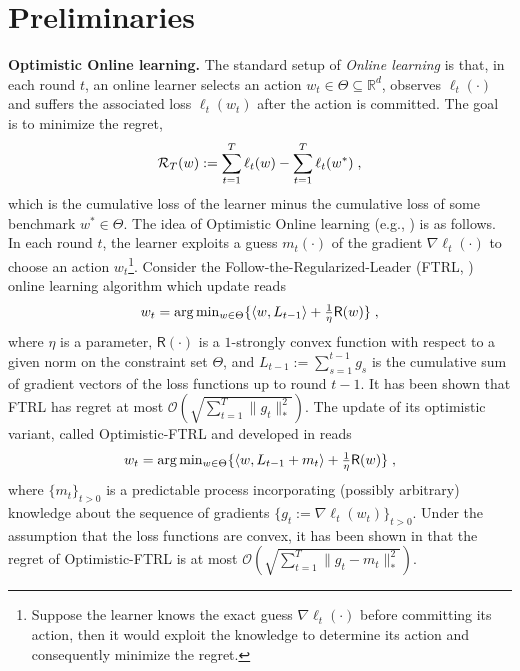 \documentclass[wcp]{jmlr}
\begin{document}
\section{Preliminaries}\label{sec:prelim}
\vspace{-0.05in}

\textbf{Optimistic Online learning.}\hspace{0.1cm}
The standard setup of \emph{Online learning} is that, in each round $t$, an online learner selects an action $w_{t} \in \Theta \subseteq \mathbb R^{d}$, observes $\ell_{t}(\cdot)$ and suffers the associated loss $\ell_{t}(w_t)$ after the action is committed.
The goal is to minimize the regret, 
$$\mathcal{R}_{T}( w  ):= \sum_{t=1}^T \ell_{t}(w) - \sum_{t=1}^T \ell_{t}(w^*)\eqsp,$$
which is the cumulative loss of the learner minus the cumulative loss of some benchmark $w^{*} \in \Theta$.
The idea of Optimistic Online learning (e.g., \citep{CJ12,RS13b,SALS15,ALLW18}) is as follows.
In each round $t$, the learner exploits a guess $m_t(\cdot)$ of the gradient $\nabla \ell_t(\cdot)$ to choose an action $w_t$\footnote{Suppose the learner knows the exact guess $\nabla \ell_t(\cdot)$ before committing its action, then it would exploit the knowledge to determine its action and consequently minimize the regret.}. 
Consider the Follow-the-Regularized-Leader (FTRL, \citep{H14}) online learning algorithm which update reads
\begin{equation} \notag
\textstyle w_t  = \arg \min_{w \in \Theta} \{ \langle w , L_{t-1} \rangle + \frac{1}{\eta} \textsf{R}(w) \} \eqsp,
\end{equation}
where $\eta$ is a parameter, $\textsf{R}(\cdot)$ is a $1$-strongly convex function with respect to a given norm on the constraint set $\Theta$, and $L_{t-1}:= \sum_{s=1}^{t-1} g_s$ is the cumulative sum of gradient vectors of the loss functions up to round $t-1$. It has been shown that FTRL has regret at most $\mathcal{O}(\sqrt{\sum_{t=1}^T \| g_t \|_*^2})$.
The update of its optimistic variant, called Optimistic-FTRL and developed in \citet{SALS15} reads
\begin{equation} \label{optFTRL}
\textstyle w_t  = \arg \min_{w \in \Theta} \{ \langle w , L_{t-1} + m_t \rangle + \frac{1}{\eta} \textsf{R}(w) \}\eqsp,
\end{equation}
where $\{m_{t}\}_{t>0}$ is a predictable process incorporating (possibly arbitrary) knowledge about the sequence of gradients $\{ g_{t}:=\nabla \ell_t(w_t)\}_{t>0}$.
Under the assumption that the loss functions are convex, it has been shown in \citet{SALS15} that the regret of Optimistic-FTRL is at most $\mathcal{O}(\sqrt{\sum_{t=1}^T \| g_t - m_t \|_*^2 } )$.
\end{document}
